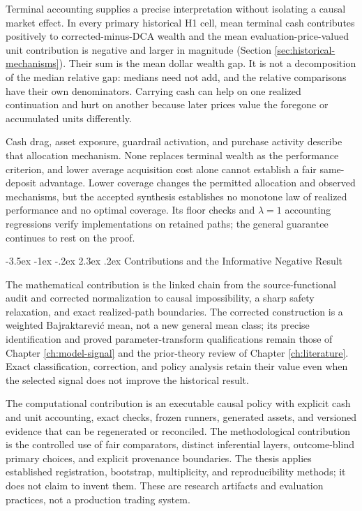 \documentclass[12pt,a4paper,oneside]{report}
\makeatletter
\renewcommand\section{\@startsection{section}{1}{\z@}%
  {-3.5ex \@plus -1ex \@minus -.2ex}%
  {2.3ex \@plus .2ex}%
  {\normalfont\fontsize{14}{17}\selectfont\bfseries}}
\makeatother
\begin{document}
Terminal accounting supplies a precise interpretation without isolating a
causal market effect. In every primary historical H1 cell, mean terminal cash
contributes positively to corrected-minus-DCA wealth and the mean
evaluation-price-valued unit contribution is negative and larger in magnitude
(Section \ref{sec:historical-mechanisms}). Their sum is the mean dollar wealth
gap. It is not a decomposition of the median relative gap: medians need not
add, and the relative comparisons have their own denominators. Carrying cash
can help on one realized continuation and hurt on another because later prices
value the foregone or accumulated units differently.

Cash drag, asset exposure, guardrail activation, and purchase activity describe
that allocation mechanism. None replaces terminal wealth as the performance
criterion, and lower average acquisition cost alone cannot establish a fair
same-deposit advantage. Lower coverage changes the permitted allocation and
observed mechanisms, but the accepted synthesis establishes no monotone law
of realized performance and no optimal coverage. Its floor checks and
$\lambda=1$ accounting regressions verify implementations on retained paths;
the general guarantee continues to rest on the proof.

\section{Contributions and the Informative Negative Result}
\label{sec:discussion-contributions}

The mathematical contribution is the linked chain from the source-functional
audit and corrected normalization to causal impossibility, a sharp safety
relaxation, and exact realized-path boundaries. The corrected construction is
a weighted Bajraktarevi\'c mean, not a new general mean class; its precise
identification and proved parameter-transform qualifications remain those of
Chapter \ref{ch:model-signal} and the prior-theory review of Chapter
\ref{ch:literature}. Exact classification, correction, and policy analysis
retain their value even when the selected signal does not improve the
historical result.

The computational contribution is an executable causal policy with explicit
cash and unit accounting, exact checks, frozen runners, generated assets, and
versioned evidence that can be regenerated or reconciled. The methodological
contribution is the controlled use of fair comparators, distinct inferential
layers, outcome-blind primary choices, and explicit provenance boundaries.
The thesis applies established registration, bootstrap, multiplicity, and
reproducibility methods; it does not claim to invent them. These are research
artifacts and evaluation practices, not a production trading system.
\end{document}
